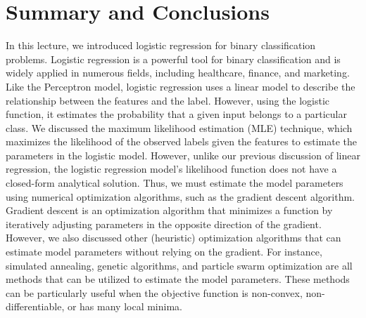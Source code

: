 \documentclass{article}[11pt]
\begin{document}
\section{Summary and Conclusions}
In this lecture, we introduced logistic regression for binary classification problems.
Logistic regression is a powerful tool for binary classification and is widely applied in numerous fields, including healthcare, finance, and marketing.
Like the Perceptron model, logistic regression uses a linear model to describe the relationship between the features and the label. However, using the logistic function, it estimates the probability that a given input belongs to a particular class. We discussed the maximum likelihood estimation (MLE) technique, which maximizes the likelihood of the observed labels given the features to estimate the parameters in the logistic model.
However, unlike our previous discussion of linear regression, the logistic regression model's likelihood function does not have a closed-form analytical solution.
Thus, we must estimate the model parameters using numerical optimization algorithms, such as the gradient descent algorithm.
Gradient descent is an optimization algorithm that minimizes a function by iteratively adjusting parameters in the opposite direction of the gradient. 
However, we also discussed other (heuristic) optimization algorithms that can estimate model parameters without relying on the gradient. 
For instance, simulated annealing, genetic algorithms, and particle swarm optimization are all methods that can be utilized to estimate the model parameters. 
These methods can be particularly useful when the objective function is non-convex, non-differentiable, or has many local minima.


\end{document}
